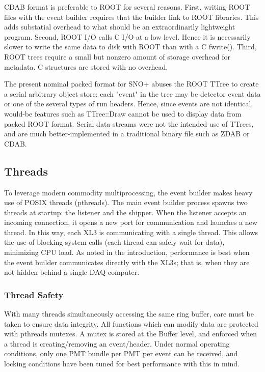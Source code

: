 \documentclass[11pt,twocolumn]{article}
\begin{document}
CDAB format is preferable to ROOT for several reasons. First, writing ROOT files with the event builder requires that the builder link to ROOT libraries. This adds substatial overhead to what should be an extraordinarily lightweight program. Second, ROOT I/O calls C I/O at a low level. Hence it is necessarily slower to write the same data to disk with ROOT than with a C fwrite(). Third, ROOT trees require a small but nonzero amount of storage overhead for metadata. C structures are stored with no overhead.

The present nominal packed format for SNO+ abuses the ROOT TTree to create a serial arbitrary object store: each "event" in the tree may be detector event data or one of the several types of run headers. Hence, since events are not identical, would-be features such as TTree::Draw cannot be used to display data from packed ROOT format. Serial data streams were not the intended use of TTrees, and are much better-implemented in a traditional binary file such as ZDAB or CDAB.

\subsection{Threads}
To leverage modern commodity multiprocessing, the event builder makes heavy use of POSIX threads (pthreads). The main event builder process spawns two threads at startup: the listener and the shipper. When the listener accepts an incoming connection, it opens a new port for communication and launches a new thread. In this way, each XL3 is communicating with a single thread. This allows the use of blocking system calls (each thread can safely wait for data), minimizing CPU load. As noted in the introduction, performance is best when the event builder communicates directly with the XL3s; that is, when they are not hidden behind a single DAQ computer.

\subsubsection{Thread Safety}
With many threads simultaneously accessing the same ring buffer, care must be taken to ensure data integrity. All functions which can modify data are protected with pthreads mutexes. A mutex is stored at the Buffer level, and enforced when a thread is creating/removing an event/header. Under normal operating conditions, only one PMT bundle per PMT per event can be received, and locking conditions have been tuned for best performance with this in mind.
\end{document}
